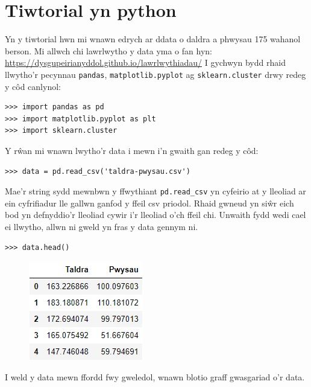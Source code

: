 \section{Tiwtorial yn python}
Yn y tiwtorial hwn mi wnawn edrych ar ddata o daldra a phwysau 175 wahanol berson. Mi allwch chi lawrlwytho y data yma o fan hyn: \url{https://dysgupeirianyddol.github.io/lawrlwythiadau/}
I gychwyn bydd rhaid llwytho'r pecynnau \texttt{pandas}, \texttt{matplotlib.pyplot} ag \texttt{sklearn.cluster} drwy redeg y c\^{o}d canlynol:

\begin{verbatim}
>>> import pandas as pd
>>> import matplotlib.pyplot as plt
>>> import sklearn.cluster
\end{verbatim}

Y r\^{w}an mi wnawn lwytho'r data i mewn i'n gwaith gan redeg y c\^{o}d:

\begin{verbatim}
>>> data = pd.read_csv('taldra-pwysau.csv')
\end{verbatim}

Mae'r string sydd mewnbwn y ffwythiant \texttt{pd.read_csv} yn cyfeirio at y lleoliad ar ein cyfrifiadur lle gallwn ganfod y ffeil csv priodol. Rhaid gwneud yn si\^{w}r eich bod yn defnyddio'r lleoliad cywir i'r lleoliad o'ch ffeil chi.
Unwaith fydd wedi cael ei llwytho, allwn ni gweld yn fras y data gennym ni. 

\begin{verbatim}
>>> data.head()
\end{verbatim}

\begin{figure}[H]
\begin{center}
\includegraphics[width=0.35\linewidth]{../img/tabl1.jpg}
\end{center}
\label{fig:Data1}
\end{figure}

I weld y data mewn ffordd fwy gweledol, wnawn blotio graff gwasgariad o'r data.

